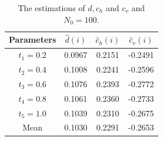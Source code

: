 \documentclass[11pt]{article}
\begin{document}
\begin{table}[!htbp]
\begin{center} %
\begin{tabular}{cccc} %
\hline\hline                        %
 Parameters & $\hat{d}(i)$ & $\hat{c}_{h}(i)$ & $\hat{c}_{v}(i)$ \\
\hline
 $t_1=0.2$  &  0.0967  &  0.2151  & -0.2491 \\
 $t_2=0.4$  &  0.1008  &  0.2241  & -0.2596\\
 $t_3=0.6$  &  0.1076  &  0.2393  & -0.2772 \\
 $t_4=0.8$  &  0.1061  &  0.2360  & -0.2733 \\
 $t_5=1.0$  &  0.1039  &  0.2310  & -0.2675  \\  
\hline\hline %
Mean & 0.1030& 0.2291&-0.2653 \\
\end{tabular}
\caption{The estimations of $d, c_{h}$ and $c_{v}$ and $N_0=100$. }
\label{table:nonlin} %
\end{center}
\end{table}
\end{document}
